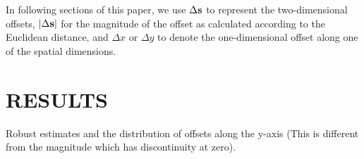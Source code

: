 In following sections of this paper, we use $\Delta {\bf s}$  to represent the
two-dimensional offsets, $|\Delta {\bf s}|$ for the magnitude of the offset as calculated
according to the Euclidean distance, and $\Delta x$ or $\Delta y$ to denote the
one-dimensional offset along one of the spatial dimensions.
 
\section{RESULTS} 
\label{sec:results}

\begin{table*}
	\begin{minipage}{170mm}
	\begin{center}
		\caption{Robust estimates and the distribution of offsets along the y-axis
			(This is different from the magnitude which has discontinuity at zero).
		\label{tab:p_val_table}
	}
	
	\end{center}
	\end{minipage}
\end{table*}


